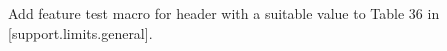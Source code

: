 Add feature test macro
 for header  with a suitable value to
Table 36 in [support.limits.general].








\renewcommand{\bibname}{References}



